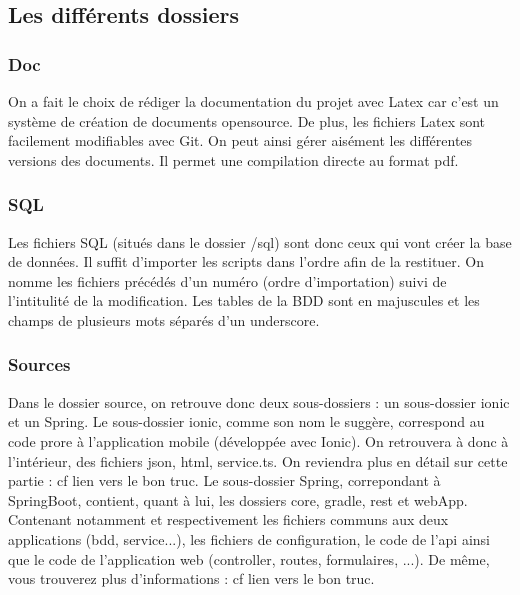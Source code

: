 		\subsection{Les différents dossiers}
			\subsubsection{Doc}
				On a fait le choix de rédiger la documentation du projet avec Latex car c'est un système de création de documents opensource. De plus, les fichiers Latex sont facilement modifiables avec Git. On peut ainsi gérer aisément les différentes versions des documents. Il permet une compilation directe au format pdf.

			\subsubsection{SQL}
				Les fichiers SQL (situés dans le dossier /sql) sont donc ceux qui vont créer la base de données. Il suffit d'importer les scripts dans l'ordre afin de la restituer. On nomme les fichiers précédés d'un numéro (ordre d'importation) suivi de l'intitulité de la modification. Les tables de la BDD sont en majuscules et les champs de plusieurs mots séparés d'un underscore.

			\subsubsection{Sources}
				Dans le dossier source, on retrouve donc deux sous-dossiers : un sous-dossier ionic et un Spring.
				Le sous-dossier ionic, comme son nom le suggère, correspond au code prore à l'application mobile (développée avec Ionic). On retrouvera à donc à l'intérieur, des fichiers json, html, service.ts. On reviendra plus en détail sur cette partie : cf lien vers le bon truc. 	%
				Le sous-dossier Spring, correpondant à SpringBoot, contient, quant à lui, les dossiers core, gradle, rest et webApp. Contenant notamment et respectivement les fichiers communs aux deux applications (bdd, service...), les fichiers de configuration, le code de l'api ainsi que le code de l'application web (controller, routes, formulaires, ...).
				De même, vous trouverez plus d'informations : cf lien vers le bon truc. %

